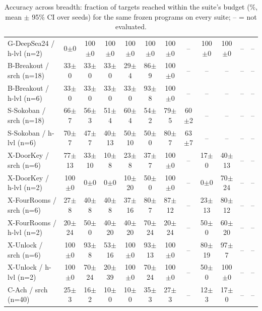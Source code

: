 \begin{table}[t]
\begin{tabular}{lccccccccccc}
G-DeepSea24 / h-lvl (n=2) & 0$\pm$0 & 100$\pm$0 & 100$\pm$0 & 100$\pm$0 & 100$\pm$0 & 100$\pm$0 & -- & 100$\pm$0 & 100$\pm$0 & -- & -- \\
B-Breakout / srch (n=18) & 33$\pm$0 & 33$\pm$0 & 33$\pm$0 & 29$\pm$4 & 86$\pm$9 & 100$\pm$0 & -- & -- & -- & -- & -- \\
B-Breakout / h-lvl (n=6) & 33$\pm$0 & 33$\pm$0 & 33$\pm$0 & 33$\pm$0 & 93$\pm$8 & 100$\pm$0 & -- & -- & -- & -- & -- \\
S-Sokoban / srch (n=18) & 66$\pm$7 & 56$\pm$3 & 51$\pm$4 & 60$\pm$4 & 54$\pm$2 & 79$\pm$5 & 60$\pm$2 & -- & -- & -- & -- \\
S-Sokoban / h-lvl (n=6) & 70$\pm$7 & 47$\pm$7 & 40$\pm$13 & 50$\pm$10 & 50$\pm$0 & 80$\pm$7 & 63$\pm$7 & -- & -- & -- & -- \\
X-DoorKey / srch (n=6) & 77$\pm$13 & 33$\pm$10 & 10$\pm$8 & 23$\pm$8 & 37$\pm$7 & 100$\pm$0 & -- & 17$\pm$0 & 40$\pm$13 & -- & -- \\
X-DoorKey / h-lvl (n=2) & 100$\pm$0 & 0$\pm$0 & 0$\pm$0 & 10$\pm$20 & 50$\pm$0 & 100$\pm$0 & -- & 0$\pm$0 & 70$\pm$24 & -- & -- \\
X-FourRooms / srch (n=6) & 27$\pm$8 & 40$\pm$8 & 40$\pm$8 & 37$\pm$16 & 80$\pm$7 & 87$\pm$12 & -- & 23$\pm$13 & 80$\pm$12 & -- & -- \\
X-FourRooms / h-lvl (n=2) & 20$\pm$24 & 50$\pm$0 & 40$\pm$20 & 40$\pm$20 & 70$\pm$24 & 20$\pm$24 & -- & 50$\pm$0 & 60$\pm$20 & -- & -- \\
X-Unlock / srch (n=6) & 100$\pm$0 & 93$\pm$8 & 53$\pm$16 & 100$\pm$0 & 93$\pm$13 & 100$\pm$0 & -- & 80$\pm$19 & 97$\pm$7 & -- & -- \\
X-Unlock / h-lvl (n=2) & 100$\pm$0 & 70$\pm$24 & 20$\pm$39 & 100$\pm$0 & 70$\pm$24 & 100$\pm$0 & -- & 50$\pm$0 & 100$\pm$0 & -- & -- \\
C-Ach / srch (n=40) & 25$\pm$3 & 16$\pm$2 & 10$\pm$0 & 10$\pm$0 & 35$\pm$3 & 27$\pm$3 & -- & 12$\pm$3 & 17$\pm$0 & -- & -- \\
\bottomrule
\end{tabular}
\caption{Accuracy across breadth: fraction of targets reached within the suite's budget (\%, mean $\pm$ 95\% CI over seeds) for the same frozen programs on every suite; -- = not evaluated.}
\label{tab:breadth}
\end{table}
